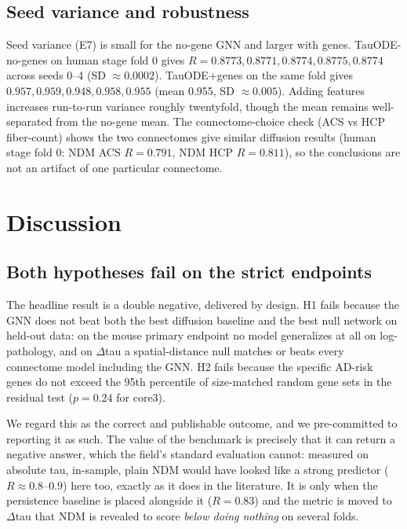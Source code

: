 \documentclass{article}
\begin{document}
\subsection{Seed variance and robustness}

Seed variance (E7) is small for the no-gene GNN and larger with genes. TauODE-no-genes on human stage fold 0 gives $R = 0.8773, 0.8771, 0.8774, 0.8775, 0.8774$ across seeds 0--4 (SD $\approx 0.0002$). TauODE+genes on the same fold gives $0.957, 0.959, 0.948, 0.958, 0.955$ (mean 0.955, SD $\approx 0.005$). Adding features increases run-to-run variance roughly twentyfold, though the mean remains well-separated from the no-gene mean. The connectome-choice check (ACS vs HCP fiber-count) shows the two connectomes give similar diffusion results (human stage fold 0: NDM ACS $R = 0.791$, NDM HCP $R = 0.811$), so the conclusions are not an artifact of one particular connectome.

\section{Discussion}

\subsection{Both hypotheses fail on the strict endpoints}

The headline result is a double negative, delivered by design. H1 fails because the GNN does not beat both the best diffusion baseline and the best null network on held-out data: on the mouse primary endpoint no model generalizes at all on log-pathology, and on $\Delta$tau a spatial-distance null matches or beats every connectome model including the GNN. H2 fails because the specific AD-risk genes do not exceed the 95th percentile of size-matched random gene sets in the residual test ($p = 0.24$ for core3).

We regard this as the correct and publishable outcome, and we pre-committed to reporting it as such. The value of the benchmark is precisely that it can return a negative answer, which the field's standard evaluation cannot: measured on absolute tau, in-sample, plain NDM would have looked like a strong predictor ($R \approx 0.8$--$0.9$) here too, exactly as it does in the literature. It is only when the persistence baseline is placed alongside it ($R = 0.83$) and the metric is moved to $\Delta$tau that NDM is revealed to score \textit{below doing nothing} on several folds.
\end{document}
